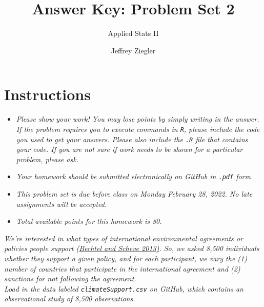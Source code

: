\documentclass[12pt,letterpaper]{article}
\title{Answer Key: Problem Set 2}
\date{Jeffrey Ziegler}
\author{Applied Stats II}
\begin{document}
	\maketitle
	
	\section*{Instructions}
	\begin{itemize}
		\item \textit{Please show your work! You may lose points by simply writing in the answer. If the problem requires you to execute commands in \texttt{R}, please include the code you used to get your answers. Please also include the \texttt{.R} file that contains your code. If you are not sure if work needs to be shown for a particular problem, please ask.}
		\item \textit{Your homework should be submitted electronically on GitHub in \texttt{.pdf} form.}
		\item \textit{This problem set is due before class on Monday February 28, 2022. No late assignments will be accepted.}
		\item \textit{Total available points for this homework is 80.}
	\end{itemize}
	
	\vspace{.25cm}
\noindent \textit{We're interested in what types of international environmental agreements or policies people support (\href{https://www.pnas.org/content/110/34/13763}{Bechtel and Scheve 2013)}. So, we asked 8,500 individuals whether they support a given policy, and for each participant, we vary the (1) number of countries that participate in the international agreement and (2) sanctions for not following the agreement.} \\

\noindent \textit{Load in the data labeled \texttt{climateSupport.csv} on GitHub, which contains an observational study of 8,500 observations.}
\end{document}
